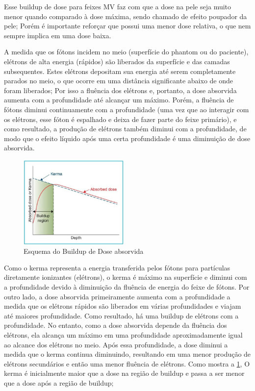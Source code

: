 \documentclass[11pt,a4paper]{article}
\begin{document}
	Esse buildup de dose para feixes MV faz com que a dose na pele seja muito menor quando comparado à dose máxima, sendo chamado de efeito poupador da pele; Porém é importante reforçar que possui uma menor dose relativa, o que nem sempre implica em uma dose baixa.

		

	A medida que os fótons incidem no meio (superfície do phantom ou do paciente), elétrons de alta energia (rápidos) são liberados da superfície e das camadas subsequentes. Estes elétrons depositam sua energia até serem completamente parados no meio, o que ocorre em uma distância significante abaixo de onde foram liberados; Por isso  a fluência dos elétrons e, portanto, a dose absorvida aumenta com a profundidade até alcançar um máximo. Porém, a fluência de fótons diminui continuamente com a profundidade (uma vez que ao interagir com os elétrons, esse fóton é espalhado e deixa de fazer parte do feixe primário), e como resultado, a produção de elétrons também diminui com a profundidade, de modo que o efeito líquido após uma certa profundidade é uma diminuição de dose absorvida. 

		\begin{figure}
			\centering
			\includegraphics[width=0.48\textwidth]{Imagens/esquemaBuildup.JPG}
			\caption{Esquema do Buildup de Dose absorvida}
			\label{fig:esquemaBuildup}
		\end{figure}

	Como o kerma representa a energia transferida pelos fótons para partículas diretamente ionizantes (elétrons), o kerma é máximo na superfície e diminui com a profundidade devido à diminuição da fluência de energia do feixe de fótons. Por outro lado, a dose absorvida primeiramente aumenta com a profundidade a medida que os elétrons rápidos são liberados em várias profundidades e viajam até maiores profundidade. Como resultado, há uma buildup de elétrons com a profundidade. No entanto, como a dose absorvida depende da fluência dos elétrons, ela alcança um máximo em uma profundidade aproximadamente igual ao alcance dos elétrons no meio. Após essa profundidade, a dose diminui a medida que o kerma continua diminuindo, resultando em uma menor produção de elétrons secundários e então uma menor fluência de elétrons. Como mostra a \ref{fig:esquemaBuildup}, O kerma é inicialmente maior que a dose na região de buildup e passa a ser menor que a dose após a região de buildup; 
\end{document}
